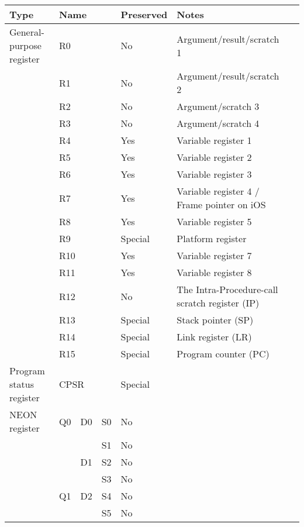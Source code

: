 	\begin{tabular}{lllllll}
		\toprule
		Type						&	\multicolumn{3}{l}{Name}	&	Preserved	&	Notes						\\
		\midrule
	 	General-purpose register	&	\multicolumn{3}{l}{R0}		&	No			&	Argument/result/scratch 1   \\
							 		&	\multicolumn{3}{l}{R1}		&	No			&	Argument/result/scratch 2   \\
							 		&	\multicolumn{3}{l}{R2}		&	No			&	Argument/scratch 3			\\
							 		&	\multicolumn{3}{l}{R3}		&	No			&	Argument/scratch 4			\\
							 		&	\multicolumn{3}{l}{R4}		&	Yes			&	Variable register 1			\\
							 		&	\multicolumn{3}{l}{R5}		&	Yes			&	Variable register 2			\\
							 		&	\multicolumn{3}{l}{R6}		&	Yes			&	Variable register 3			\\
							 		&	\multicolumn{3}{l}{R7}		&	Yes			&	Variable register 4 / Frame pointer on iOS	\\
							 		&	\multicolumn{3}{l}{R8}		&	Yes			&	Variable register 5			\\
							 		&	\multicolumn{3}{l}{R9}		&	Special		&	Platform register			\\
							 		&	\multicolumn{3}{l}{R10}		&	Yes			&	Variable register 7			\\
							 		&	\multicolumn{3}{l}{R11}		&	Yes			&	Variable register 8			\\
							 		&	\multicolumn{3}{l}{R12}		&	No			&	The Intra-Procedure-call scratch register (IP)	\\
							 		&	\multicolumn{3}{l}{R13}		&	Special		&	Stack pointer (SP)	 		\\
							 		&	\multicolumn{3}{l}{R14}		&	Special		&	Link register (LR)	 		\\
							 		&	\multicolumn{3}{l}{R15}		&	Special		&	Program counter (PC) 		\\
		Program status register		&	\multicolumn{3}{l}{CPSR}	&	Special		&						 		\\
		NEON register				&	Q0	&	D0	&	S0			&	No			&	  		\\
									&		&		&	S1			&	No			&	  		\\
									&		&	D1	&	S2			&	No			&	  		\\
									&		&		&	S3			&	No			&	  		\\
									&	Q1	&	D2	&	S4			&	No			&	  		\\
									&		&		&	S5			&	No			&	  		\\

\end{tabular}
